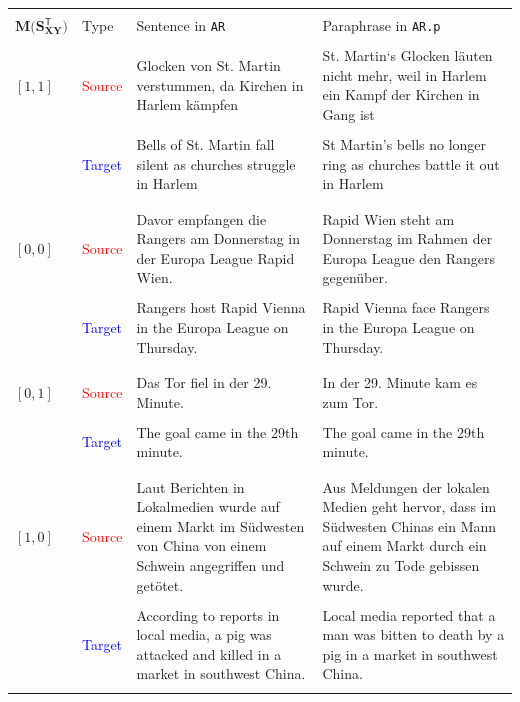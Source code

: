 \documentclass[11pt,a4paper]{article}
\begin{document}
\begin{table}[t!]
  \centering
  \begin{tabular*}{\textwidth}{ll p{5.9cm} p{5.9cm}}
    \hline \\[-10pt]
    $\mathbf{M(S_{XY}^{\mathsf{T}}})$ & Type & Sentence in \texttt{AR} & Paraphrase in \texttt{AR.p} \\[5pt]
    \hline \hline \\[-10pt]
    $[1,1]$ & \textcolor{red}{Source} & Glocken von St. Martin verstummen, da Kirchen in Harlem kämpfen &  St. Martin‘s Glocken läuten nicht mehr, weil in Harlem ein Kampf der Kirchen in Gang ist \\\\[-5pt]
                                      & \textcolor{blue}{Target} & Bells of St. Martin fall silent as churches struggle in Harlem & St Martin's bells no longer ring as churches battle it out in Harlem \\\\[-10pt]
    \hline \\[-10pt]
    $[0,0]$ & \textcolor{red}{Source} & Davor empfangen die Rangers am Donnerstag in der Europa League Rapid Wien. & Rapid Wien steht am Donnerstag im Rahmen der Europa League den Rangers gegenüber. \\\\[-5pt]
                                      & \textcolor{blue}{Target} & Rangers host Rapid Vienna in the Europa League on Thursday. & Rapid Vienna face Rangers in the Europa League on Thursday. \\\\[-10pt]
    \hline \\[-10pt]
    $[0,1]$ & \textcolor{red}{Source} & Das Tor fiel in der 29. Minute. & In der 29. Minute kam es zum Tor. \\\\[-5pt]
                                      & \textcolor{blue}{Target} & The goal came in the 29th minute. & The goal came in the 29th minute. \\\\[-10pt]
    \hline \\[-10pt]
    $[1,0]$ & \textcolor{red}{Source} & Laut Berichten in Lokalmedien wurde auf einem Markt im Südwesten von China von einem Schwein angegriffen und getötet. & Aus Meldungen der lokalen Medien geht hervor, dass im Südwesten Chinas ein Mann auf einem Markt durch ein Schwein zu Tode gebissen wurde.  \\\\[-5pt]
                                      & \textcolor{blue}{Target} & According to reports in local media, a pig was attacked and killed in a market in southwest China. & Local media reported that a man was bitten to death by a pig in a market in southwest China. \\\\[-10pt]

\end{tabular*}
\end{table}
\end{document}
